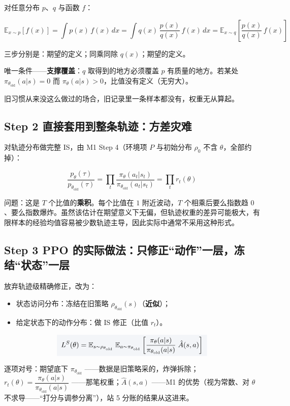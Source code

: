 \documentclass[UTF8,12pt,a4paper]{ctexrep}
\renewcommand{\boxed}[1]{{\colorbox{lightgray}{$\displaystyle #1$}}}
\newcommand{\plain}[1]{\begin{plainbox}#1\end{plainbox}}
\begin{document}
对任意分布 $p$、$q$ 与函数 $f$：

$$
\mathbb{E}_{x \sim p}[f(x)] = \int p(x)\, f(x)\, dx = \int q(x)\,\frac{p(x)}{q(x)}\, f(x)\, dx = \mathbb{E}_{x \sim q}\left[\frac{p(x)}{q(x)}\, f(x)\right]
$$

三步分别是：期望的定义；同乘同除 $q(x)$；期望的定义。

唯一条件——\textbf{支撑覆盖}：$q$ 取得到的地方必须覆盖 $p$ 有质量的地方。若某处 $\pi_{\theta_{\mathrm{old}}}(a|s) = 0$ 而 $\pi_\theta(a|s) > 0$，比值没有定义（无穷大）。

\plain{旧习惯从来没这么做过的场合，旧记录里一条样本都没有，权重无从算起。}

\subsection*{Step 2 \; 直接套用到整条轨迹：方差灾难}

对轨迹分布做完整 IS，由 M1 Step 4（环境项 $P$ 与初始分布 $\rho_0$ 不含 $\theta$，全部约掉）：

$$
\frac{p_\theta(\tau)}{p_{\theta_{\mathrm{old}}}(\tau)} = \prod_{t} \frac{\pi_\theta(a_t|s_t)}{\pi_{\theta_{\mathrm{old}}}(a_t|s_t)} = \prod_t r_t(\theta)
$$

问题：这是 $T$ 个比值的\textbf{乘积}。每个比值在 $1$ 附近波动，$T$ 个相乘后要么指数趋 $0$、要么指数爆炸。虽然该估计在期望意义下无偏，但轨迹权重的差异可能极大，有限样本的经验均值容易被少数轨迹主导，因此实际中通常不采用这种形式。

\subsection*{Step 3 \; PPO 的实际做法：只修正``动作''一层，冻结``状态''一层}

放弃轨迹级精确修正，改为：

\begin{itemize}[nosep]
  \item 状态访问分布：冻结在旧策略 $\rho_{\theta_{\mathrm{old}}}(s)$（\textbf{近似}）；
  \item 给定状态下的动作分布：做 IS 修正（比值 $r_t$）。
\end{itemize}

$$
\boxed{\;L^{S}(\theta) = \mathbb{E}_{s \sim \rho_{\theta_{\mathrm{old}}}}\;\mathbb{E}_{a \sim \pi_{\theta_{\mathrm{old}}}}\left[\frac{\pi_\theta(a|s)}{\pi_{\theta_{\mathrm{old}}}(a|s)}\; \hat{A}(s,a)\right]\;}
$$

逐项对号：期望底下 $\pi_{\theta_{\mathrm{old}}}$ ——数据是旧策略采的，炸弹拆除；$r_t(\theta) = \dfrac{\pi_\theta(a|s)}{\pi_{\theta_{\mathrm{old}}}(a|s)}$ ——那笔权重；$\hat{A}(s,a)$ ——M1 的优势（视为常数、对 $\theta$ 不求导——``打分与调参分离''），站 5 分账的结果从这进来。
\end{document}
